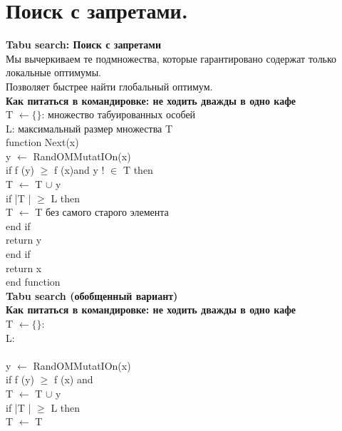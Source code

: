 \newcommand\tab[1][1cm]{\hspace*{#1}}
\section{Поиск с запретами.}
\textbf{Tabu search: Поиск с запретами}\\
Мы вычеркиваем те подмножества, которые гарантировано содержат только локальные оптимумы.\\
Позволяет быстрее найти глобальный оптимум.\\ 

\textbf{Как питаться в командировке: не ходить дважды в одно кафе}\\
T $\leftarrow \lbrace \rbrace$: множество табуированных особей  \\
L: максимальный размер множества T  \\
function Next(x)  \\
\tab y $\leftarrow$ RandOMMutatIOn(x)  \\
\tab if f (y) $\ge$ f (x)and y ! $\in$ T then  \\
\tab \tab T $\leftarrow$ T $\cup$ {y}  \\
\tab \tab if |T | $\ge$ L then  \\
\tab \tab \tab T $\leftarrow$ T без самого старого элемента  \\
\tab \tab end if  \\
\tab \tab return y  \\
\tab end if  \\
\tab return x  \\
end function \\

\textbf{Tabu search (обобщенный вариант)}\\
\textbf{Как питаться в командировке: не ходить дважды в одно кафе}\\
T $\leftarrow \lbrace \rbrace$:  \\
L:  \\
  \\
\tab y $\leftarrow$ RandOMMutatIOn(x)  \\
\tab if f (y) $\ge$ f (x) and   \\
\tab \tab T $\leftarrow$ T $\cup$ {y}  \\
\tab \tab if |T | $\ge$ L then  \\
\tab \tab \tab T $\leftarrow$ T   \\
\tab \tab {}  \\
\tab \tab {}  \\
\tab {}  \\
\tab {}  \\
 \\

